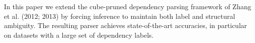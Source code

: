 In this paper we extend the cube-pruned dependency parsing framework of Zhang et al. (2012; 2013) by forcing inference to maintain both label and structural ambiguity. The resulting parser achieves state-of-the-art accuracies, in particular on datasets with a large set of dependency labels.
